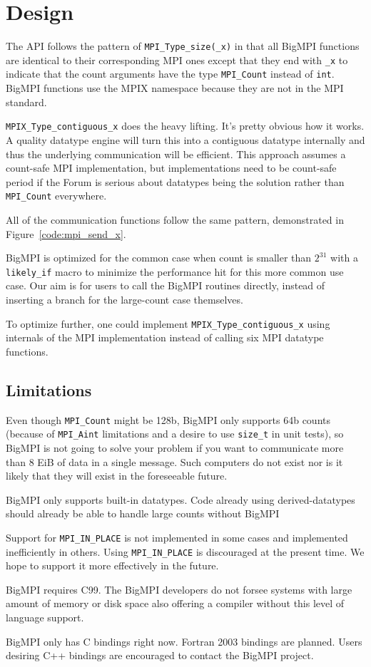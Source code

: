 
\section{Design}

The API follows the pattern of \texttt{MPI\_Type\_size(\_x)} in that all BigMPI
functions are identical to their corresponding MPI ones except that
they end with \texttt{\_x} to indicate that the count arguments have the type
\texttt{MPI\_Count} instead of \texttt{int}.
BigMPI functions use the MPIX namespace because they are not in the
MPI standard.


\texttt{MPIX\_Type\_contiguous\_x}
does the heavy lifting.  It's pretty obvious how it works.
A quality datatype engine will turn this into a contiguous datatype internally 
and thus the underlying communication will be efficient.  
This approach assumes a count-safe MPI implementation, but implementations need
to be count-safe period if the Forum is serious about datatypes being
the solution rather than \texttt{MPI\_Count} everywhere.

All of the communication functions follow the same pattern, demonstrated in
Figure~\ref{code:mpi_send_x}.

BigMPI is optimized for the common case when count is smaller than $2^{31}$
with a \texttt{likely\_if} macro to minimize the performance hit for
this more common use case.  Our aim is for users to call the BigMPI routines
directly, instead of inserting a branch for the large-count case themselves.

To optimize further, one could implement
\texttt{MPIX\_Type\_contiguous\_x} using internals of the MPI implementation
instead of calling six MPI datatype functions.

\subsection{Limitations}

Even though \texttt{MPI\_Count} might be 128b, BigMPI only supports
64b counts (because of \texttt{MPI\_Aint} limitations and a desire to use \texttt{size\_t}
in unit tests), so BigMPI is not going to solve your problem if you
want to communicate more than 8 EiB of data in a single message.
Such computers do not exist nor is it likely that they will exist
in the foreseeable future.

BigMPI only supports built-in datatypes.  Code already using
derived-datatypes should already be able to handle large
counts without BigMPI 

Support for \texttt{MPI\_IN\_PLACE} is not implemented in some cases and
implemented inefficiently in others.
Using \texttt{MPI\_IN\_PLACE} is discouraged at the present time.
We hope to support it more effectively in the future.

BigMPI requires C99.  The BigMPI developers do not forsee systems with large
amount of memory or disk space also offering a compiler without this level of language support.

BigMPI only has C bindings right now.
Fortran 2003 bindings are planned.
Users desiring C++ bindings are encouraged to contact the BigMPI project.
